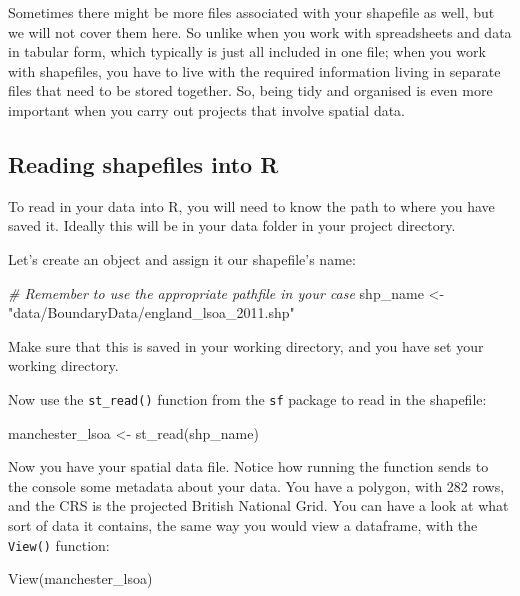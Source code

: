 \documentclass[
  krantz2]{krantz}
\makeatletter
\newenvironment{Shaded}{\begin{snugshade}}{\end{snugshade}}
\newcommand{\CommentTok}[1]{\textcolor[rgb]{0.37,0.37,0.37}{\textit{#1}}}
\newcommand{\FunctionTok}[1]{\textcolor[rgb]{0,0,0}{#1}}
\newcommand{\NormalTok}[1]{#1}
\newcommand{\OtherTok}[1]{\textcolor[rgb]{0.37,0.37,0.37}{#1}}
\newcommand{\StringTok}[1]{\textcolor[rgb]{0.5,0.5,0.5}{#1}}
\newenvironment{kframe}{%
\medskip{}
\setlength{\fboxsep}{.8em}
 \def\at@end@of@kframe{}%
 \ifinner\ifhmode%
  \def\at@end@of@kframe{\end{minipage}}%
  \begin{minipage}{\columnwidth}%
 \fi\fi%
 \def\FrameCommand##1{\hskip\@totalleftmargin \hskip-\fboxsep
 \colorbox{shadecolor}{##1}\hskip-\fboxsep
     \hskip-\linewidth \hskip-\@totalleftmargin \hskip\columnwidth}%
 \MakeFramed {\advance\hsize-\width
   \@totalleftmargin\z@ \linewidth\hsize
   \@setminipage}}%
 {\par\unskip\endMakeFramed%
 \at@end@of@kframe}
\renewenvironment{Shaded}{\begin{kframe}}{\end{kframe}}
\makeatother
\begin{document}
Sometimes there might be more files associated with your shapefile as well, but we will not cover them here. So unlike when you work with spreadsheets and data in tabular form, which typically is just all included in one file; when you work with shapefiles, you have to live with the required information living in separate files that need to be stored together. So, being tidy and organised is even more important when you carry out projects that involve spatial data.

\hypertarget{reading-shapefiles-into-r}{%
\subsection{Reading shapefiles into R}\label{reading-shapefiles-into-r}}

To read in your data into R, you will need to know the path to where you have saved it. Ideally this will be in your data folder in your project directory.

Let's create an object and assign it our shapefile's name:

\begin{Shaded}
\begin{Highlighting}[]
\CommentTok{\# Remember to use the appropriate pathfile in your case}
\NormalTok{shp\_name }\OtherTok{\textless{}{-}} \StringTok{"data/BoundaryData/england\_lsoa\_2011.shp"}
\end{Highlighting}
\end{Shaded}

Make sure that this is saved in your working directory, and you have set your working directory.

Now use the \texttt{st\_read()} function from the \texttt{sf} package to read in the shapefile:

\begin{Shaded}
\begin{Highlighting}[]
\NormalTok{manchester\_lsoa }\OtherTok{\textless{}{-}} \FunctionTok{st\_read}\NormalTok{(shp\_name)}
\end{Highlighting}
\end{Shaded}

Now you have your spatial data file. Notice how running the function sends to the console some metadata about your data. You have a polygon, with 282 rows, and the CRS is the projected British National Grid. You can have a look at what sort of data it contains, the same way you would view a dataframe, with the \texttt{View()} function:

\begin{Shaded}
\begin{Highlighting}[]
\FunctionTok{View}\NormalTok{(manchester\_lsoa)}
\end{Highlighting}
\end{Shaded}
\end{document}
